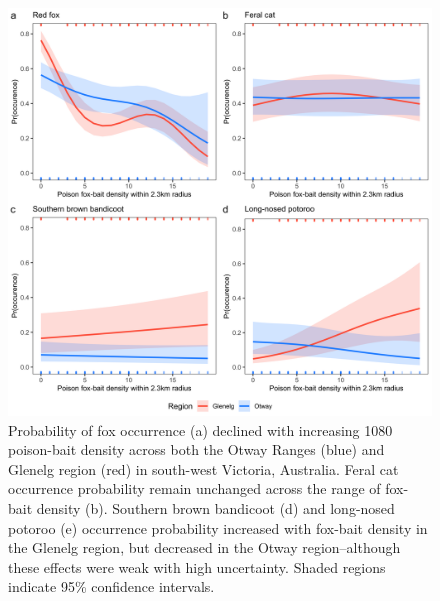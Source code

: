 \documentclass[11pt,a4paper,titlepage,twoside,openright]{style/unimelbthesis}
\begin{document}
\begin{mainmatter}
\newpage

\(~\)

\(~\)

\(~\)
\begin{figure}

{\centering \includegraphics[width=1\linewidth]{figure/foxbaits} 

}

\caption{Probability of fox occurrence (a) declined with increasing 1080 poison-bait density across both the Otway Ranges (blue) and Glenelg region (red) in south-west Victoria, Australia. Feral cat occurrence probability remain unchanged across the range of fox-bait density (b). Southern brown bandicoot (d) and long-nosed potoroo (e) occurrence probability increased with fox-bait density in the Glenelg region, but decreased in the Otway region--although these effects were weak with high uncertainty. Shaded regions indicate 95\% confidence intervals.}\label{fig:occ-1080}
\end{figure}
\newpage

\(~\)

\(~\)

\(~\)
\begin{figure}


\end{figure}
\end{mainmatter}
\end{document}

